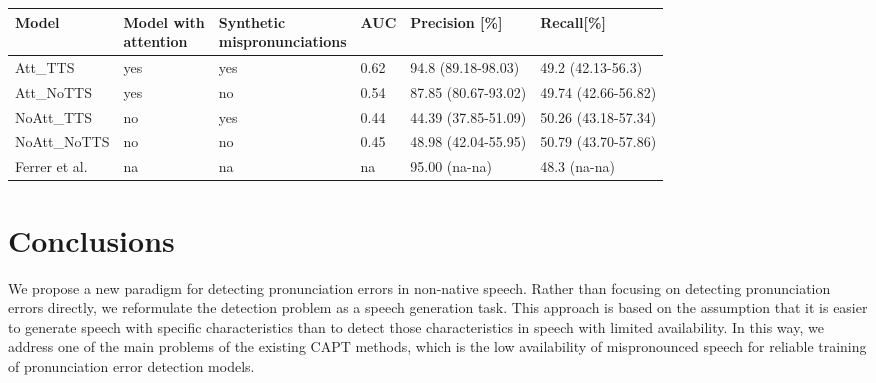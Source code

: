 \documentclass[]{interact}
\theoremstyle{plain}%
\theoremstyle{definition}
\theoremstyle{remark}
\begin{document}
\begin{table}
 {
  \centering
  \begin{tabular}{llllll}
    \toprule  
   Model & \makecell[l]{Model with \\attention} & \makecell[l]{Synthetic \\mispronunciations} & AUC & Precision [\%] & Recall[\%]  \\
    \midrule
    Att\_TTS & yes & yes & 0.62 & 94.8 (89.18-98.03) & 49.2 (42.13-56.3) \\
    Att\_NoTTS & yes & no & 0.54 & 87.85 (80.67-93.02) & 49.74 (42.66-56.82)\\
    NoAtt\_TTS & no & yes & 0.44 & 44.39 (37.85-51.09) & 50.26 (43.18-57.34)  \\
    NoAtt\_NoTTS & no & no & 0.45 & 48.98 (42.04-55.95) & 50.79 (43.70-57.86)  \\
    Ferrer et al. \cite{ferrer2015classification} & na & na & na & 95.00 (na-na) & 48.3 (na-na)  \\
    \bottomrule
  \end{tabular}
  }
  \label{tab:lexical_stress_precision_recall_acc}
\end{table}

\section{Conclusions}
\label{sec:conclusions}
 
We propose a new paradigm for detecting pronunciation errors in non-native speech. Rather than focusing on detecting  pronunciation errors directly, we reformulate the detection problem as a speech generation task. This approach is based on the assumption that it is easier to generate speech with specific characteristics than to detect those characteristics in speech with limited availability. In this way, we address one of the main problems of the existing CAPT methods, which is the low availability of mispronounced speech for reliable training of pronunciation error detection models.
\end{document}
